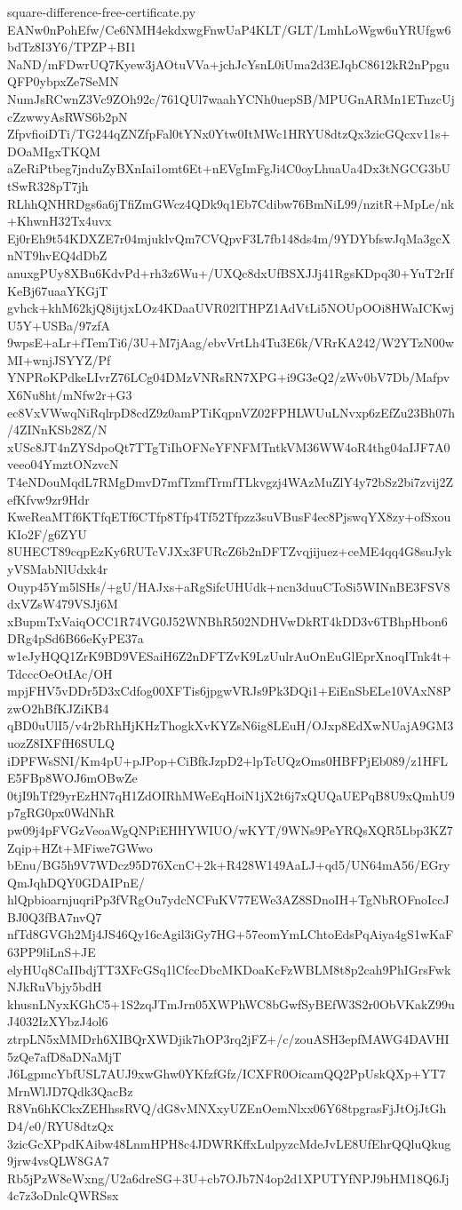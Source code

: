 \documentclass[11pt]{article}
\theoremstyle{definition}
\theoremstyle{remark}
\begin{document}
\begin{filecontents*}[overwrite]{square-difference-free-certificate.py}
EANw0nPohEfw/Ce6NMH4ekdxwgFnwUaP4KLT/GLT/LmhLoWgw6uYRUfgw6bdTz8I3Y6/TPZP+BI1
NaND/mFDwrUQ7Kyew3jAOtuVVa+jchJcYsnL0iUma2d3EJqbC8612kR2nPpguQFP0ybpxZe7SeMN
NumJsRCwnZ3Vc9ZOh92c/761QUl7waahYCNh0uepSB/MPUGnARMn1ETnzcUjcZzwwyAsRWS6b2pN
ZfpvfioiDTi/TG244qZNZfpFal0tYNx0Ytw0ItMWc1HRYU8dtzQx3zicGQcxv11s+DOaMIgxTKQM
aZeRiPtbeg7jnduZyBXnIai1omt6Et+nEVgImFgJi4C0oyLhuaUa4Dx3tNGCG3bUtSwR328pT7jh
RLhhQNHRDgs6a6jTfiZmGWcz4QDk9q1Eb7Cdibw76BmNiL99/nzitR+MpLe/nk+KhwnH32Tx4uvx
Ej0rEh9t54KDXZE7r04mjuklvQm7CVQpvF3L7fb148ds4m/9YDYbfswJqMa3gcXnNT9hvEQ4dDbZ
anuxgPUy8XBu6KdvPd+rh3z6Wu+/UXQc8dxUfBSXJJj41RgsKDpq30+YuT2rIfKeBj67uaaYKGjT
gvhck+khM62kjQ8ijtjxLOz4KDaaUVR02lTHPZ1AdVtLi5NOUpOOi8HWaICKwjU5Y+USBa/97zfA
9wpsE+aLr+fTemTi6/3U+M7jAag/ebvVrtLh4Tu3E6k/VRrKA242/W2YTzN00wMI+wnjJSYYZ/Pf
YNPRoKPdkeLIvrZ76LCg04DMzVNRsRN7XPG+i9G3eQ2/zWv0bV7Db/MafpvX6Nu8ht/mNfw2r+G3
ec8VxVWwqNiRqlrpD8cdZ9z0amPTiKqpnVZ02FPHLWUuLNvxp6zEfZu23Bh07h/4ZINnKSb28Z/N
xUSc8JT4nZYSdpoQt7TTgTiIhOFNeYFNFMTntkVM36WW4oR4thg04aIJF7A0veeo04YmztONzvcN
T4eNDouMqdL7RMgDmvD7mfTzmfTrmfTLkvgzj4WAzMuZlY4y72bSz2bi7zvij2ZefKfvw9zr9Hdr
KweReaMTf6KTfqETf6CTfp8Tfp4Tf52Tfpzz3suVBusF4ec8PjswqYX8zy+ofSxouKIo2F/g6ZYU
8UHECT89cqpEzKy6RUTcVJXx3FURcZ6b2nDFTZvqjijuez+ceME4qq4G8suJykyVSMabNlUdxk4r
Ouyp45Ym5lSHs/+gU/HAJxs+aRgSifcUHUdk+ncn3duuCToSi5WINnBE3FSV8dxVZsW479VSJj6M
xBupmTxVaiqOCC1R74VG0J52WNBhR502NDHVwDkRT4kDD3v6TBhpHbon6DRg4pSd6B66eKyPE37a
w1eJyHQQ1ZrK9BD9VESaiH6Z2nDFTZvK9LzUulrAuOnEuGlEprXnoqITnk4t+TdcccOeOtIAc/OH
mpjFHV5vDDr5D3xCdfog00XFTis6jpgwVRJs9Pk3DQi1+EiEnSbELe10VAxN8PzwO2hBfKJZiKB4
qBD0uUlI5/v4r2bRhHjKHzThogkXvKYZsN6ig8LEuH/OJxp8EdXwNUajA9GM3uozZ8IXFfH6SULQ
iDPFWsSNI/Km4pU+pJPop+CiBfkJzpD2+lpTcUQzOms0HBFPjEb089/z1HFLE5FBp8WOJ6mOBwZe
0tjI9hTf29yrEzHN7qH1ZdOIRhMWeEqHoiN1jX2t6j7xQUQaUEPqB8U9xQmhU9p7gRG0px0WdNhR
pw09j4pFVGzVeoaWgQNPiEHHYWIUO/wKYT/9WNs9PeYRQsXQR5Lbp3KZ7Zqip+HZt+MFiwe7GWwo
bEnu/BG5h9V7WDcz95D76XcnC+2k+R428W149AaLJ+qd5/UN64mA56/EGryQmJqhDQY0GDAIPnE/
hlQpbioarnjuqriPp3fVRgOu7ydcNCFuKV77EWe3AZ8SDnoIH+TgNbROFnoIccJBJ0Q3fBA7nvQ7
nfTd8GVGh2Mj4JS46Qy16cAgil3iGy7HG+57eomYmLChtoEdsPqAiya4gS1wKaF63PP9liLnS+JE
elyHUq8CaIIbdjTT3XFcGSq1lCfccDbcMKDoaKcFzWBLM8t8p2cah9PhIGrsFwkNJkRuVbjy5bdH
khusnLNyxKGhC5+1S2zqJTmJrn05XWPhWC8bGwfSyBEfW3S2r0ObVKakZ99uJ4032IzXYbzJ4ol6
ztrpLN5xMMDrh6XIBQrXWDjik7hOP3rq2jFZ+/c/zouASH3epfMAWG4DAVHI5zQe7afD8aDNaMjT
J6LgpmcYbfUSL7AUJ9xwGhw0YKfzfGfz/ICXFR0OicamQQ2PpUskQXp+YT7MrnWlJD7Qdk3QacBz
R8Vn6hKCkxZEHhssRVQ/dG8vMNXxyUZEnOemNlxx06Y68tpgrasFjJtOjJtGhD4/e0/RYU8dtzQx
3zicGcXPpdKAibw48LnmHPH8c4JDWRKffxLulpyzcMdeJvLE8UfEhrQQluQkug9jrw4vsQLW8GA7
Rb5jPzW8eWxng/U2a6dreSG+3U+cb7OJb7N4op2d1XPUTYfNPJ9bHM18Q6Jj4c7z3oDnlcQWRSsx

\end{filecontents*}
\end{document}
